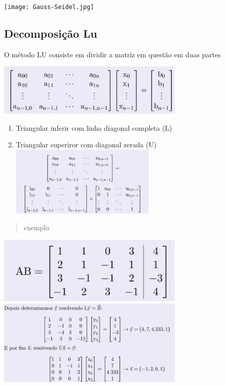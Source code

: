 \documentclass{article}
\begin{document}
\begin{multicols}{2}
        \hbox{\texttt{[image: Gauss-Seidel.jpg]}}
    
        \subsection{Decomposição Lu}

            O método LU consiste em dividir a matriz em questão em duas partes

            \hbox{\includegraphics[width=9cm]{Decomposição Linar padrão.jpg}}  
        \begin{enumerate}
            \item Triangular inferir com linha diagonal completa (L)
            \item Triangular superiror com diagonal zerada (U)
            \hbox{\includegraphics[width=7cm]{Decomposição LU.jpg}}
        \end{enumerate}

        \begin{quote}
            exemplo
        \end{quote}
        \hbox{\includegraphics[width=9cm]{Matriz_Qualquer.jpg}} 
        \hbox{\includegraphics[width=9cm]{Abertura LU.jpg}} 

        \newpage

    \section{}

\end{multicols}
\end{document}
